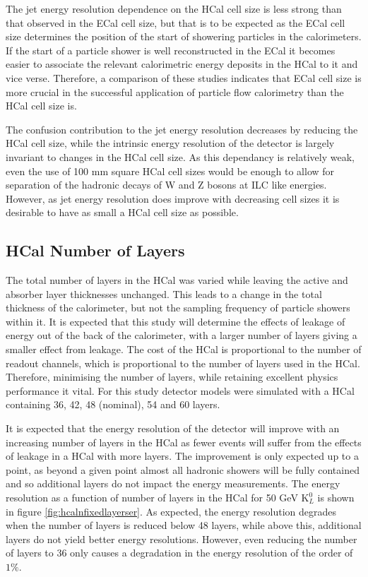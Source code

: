 The jet energy resolution dependence on the HCal cell size is less strong than that observed in the ECal cell size, but that is to be expected as the ECal cell size determines the position of the start of showering particles in the calorimeters.  If the start of a particle shower is well reconstructed in the ECal it becomes easier to associate the relevant calorimetric energy deposits in the HCal to it and vice verse.  Therefore, a comparison of these studies indicates that ECal cell size is more crucial in the successful application of particle flow calorimetry than the HCal cell size is.

The confusion contribution to the jet energy resolution decreases by reducing the HCal cell size, while the intrinsic energy resolution of the detector is largely invariant to changes in the HCal cell size.  As this dependancy is relatively weak, even the use of 100 mm square HCal cell sizes would be enough to allow for separation of the hadronic decays of W and Z bosons at ILC like energies.  However, as jet energy resolution does improve with decreasing cell sizes it is desirable to have as small a HCal cell size as possible.


\subsection{HCal Number of Layers}
\label{sec:hcalnlayers}
The total number of layers in the HCal was varied while leaving the active and absorber layer thicknesses unchanged.  This leads to a change in the total thickness of the calorimeter, but not the sampling frequency of particle showers within it.  It is expected that this study will determine the effects of leakage of energy out of the back of the calorimeter, with a larger number of layers giving a smaller effect from leakage.  The cost of the HCal is proportional to the number of readout channels, which is proportional to the number of layers used in the HCal.  Therefore, minimising the number of layers, while retaining excellent physics performance it vital.  For this study detector models were simulated with a HCal containing 36, 42, 48 (nominal), 54 and 60 layers. 

It is expected that the energy resolution of the detector will improve with an increasing number of layers in the HCal as fewer events will suffer from the effects of leakage in a HCal with more layers.  The improvement is only expected up to a point, as beyond a given point almost all hadronic showers will be fully contained and so additional layers do not impact the energy measurements.  The energy resolution as a function of number of layers in the HCal for 50 GeV $\text{K}^{0}_{L}$ is shown in figure \ref{fig:hcalnfixedlayerser}.  As expected, the energy resolution degrades when the number of layers is reduced below 48 layers, while above this, additional layers do not yield better energy resolutions.  However, even reducing the number of layers to 36 only causes a degradation in the energy resolution of the order of $1\%$.  

